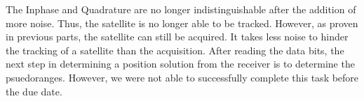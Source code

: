 \documentclass[11pt]{article}
\begin{document}
The Inphase and Quadrature are no longer indistinguishable after the addition of more noise. Thus, the satellite is no longer able to be tracked. However, as proven in previous parts, the satellite can still be acquired. It takes less noise to hinder the tracking of a satellite than the acquisition. After reading the data bits, the next step in determining a position solution from the receiver is to determine the psuedoranges. However, we were not able to successfully complete this task before the due date.
\end{document}
